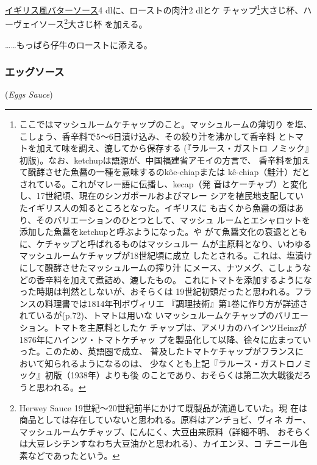 \begin{recette}
\protect\hyperlink{butter-sauce}{イギリス風バターソース}4
dlに、ローストの肉汁2 dlとケ チャップ\footnote{ここではマッシュルームケチャップのこと。マッシュルームの薄切り
  を塩、こしょう、香辛料で5〜6日漬け込み、その絞り汁を沸かして香辛料
  とトマトを加えて味を調え、漉してから保存する (『ラルース・ガストロ
  ノミック』初版)。なお、ketchupは語源が、中国福建省アモイの方言で、
  香辛料を加えて醗酵させた魚醤の一種を意味するのkôe-chiapまたは
  kê-chiap（鮭汁）だとされている。これがマレー語に伝播し、kecap（発
  音はケーチャプ）と変化し、17世紀頃、現在のシンガポールおよびマレー
  シアを植民地支配していたイギリス人の知るところとなった。イギリスに
  も古くから魚醤の類はあり、そのバリエーションのひとつとして、マッシュ
  ルームとエシャロットを添加した魚醤をketchupと呼ぶようになった。や
  がて魚醤文化の衰退とともに、ケチャップと呼ばれるものはマッシュルー
  ムが主原料となり、いわゆるマッシュルームケチャップが18世紀頃に成立
  したとされる。これは、塩漬けにして醗酵させたマッシュルームの搾り汁
  にメース、ナツメグ、こしょうなどの香辛料を加えて煮詰め、漉したもの。
  これにトマトを添加するようになった時期は判然としないが、おそらくは
  19世紀初頭だったと思われる。フランスの料理書では1814年刊ボヴィリエ
  『調理技術』第1巻に作り方が詳述されているが(p.72)、トマトは用いな
  いマッシュルームケチャップのバリエーション。トマトを主原料としたケ
  チャップは、アメリカのハインツHeinzが1876年にハインツ・トマトケチャッ
  プを製品化して以降、徐々に広まっていった。このため、英語圏で成立、
  普及したトマトケチャップがフランスにおいて知られるようになるのは、
  少なくとも上記『ラルース・ガストロノミック』初版（1938年）よりも後
  のことであり、おそらくは第二次大戦後だろうと思われる。}大さじ\undemi{}杯、ハーヴェイソース\footnote{Herwey
  Sauce 19世紀〜20世紀前半にかけて既製品が流通していた。現
  在は商品としては存在していないと思われる。原料はアンチョビ、ヴィネ
  ガー、マッシュルームケチャップ、にんにく、大豆由来原料（詳細不明、
  おそらくは大豆レシチンすなわち大豆油かと思われる）、カイエンヌ、コ
  チニール色素などであったという。}大さじ\undemi{}杯 を加える。

\ldots{}\ldots{}もっぱら仔牛のローストに添える。

\hypertarget{eggs-sauce}{%
\subsubsection{エッグソース}\label{eggs-sauce}}

\hspace{1em}(\emph{Eggs Sauce})


\end{recette}
